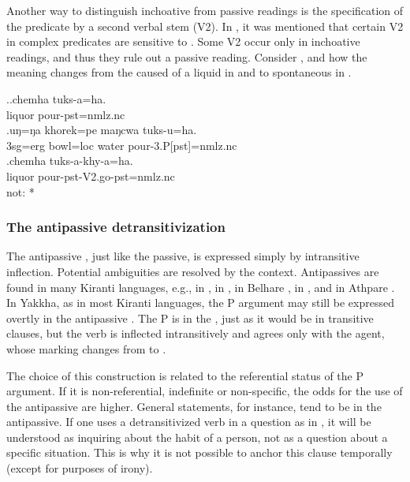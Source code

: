 Another way to distinguish inchoative from passive readings is the spe\-ci\-fi\-cation of the predicate by a second verbal stem (V2). In , it was mentioned that certain V2 in complex predicates are sensitive to . Some V2 occur only in inchoative readings, and thus they rule out a  passive reading. Consider \Next, and how the meaning changes from the caused  of a liquid in \Next[a] and \Next[b] to spontaneous  in \Next[c].

\ex.\ag.chemha tuks-a=ha.\\
liquor pour{\sc [3sg]-pst=nmlz.nc} \\
\bg.uŋ=ŋa khorek=pe maŋcwa tuks-u=ha.\\
{\sc 3sg=erg} bowl{\sc =loc} water pour{\sc -3.P[pst]=nmlz.nc}\\
\bg.chemha tuks-a-khy-a=ha.\\
liquor pour{\sc [3sg]-pst-V2.go-pst=nmlz.nc} \\
 not: *


\subsubsection{The antipassive detransitivization}\label{detr-antip}

The antipassive , just like the passive, is expressed simply by intransitive inflection. Potential ambiguities are  resolved by the context. Antipassives are  found in many Kiranti languages, e.g., in , in , in Belhare \citep{Bickel2011Detrans, Schikowski2013_Thesis}, in  \citep[221]{Doornenbal2009A-grammar}, and in Athpare \citep[122]{Ebert1997A-grammar}. In Yakkha, as in most Kiranti languages, the P argument may still be expressed overtly in the antipassive . The P is in the , just as it would be in transitive clauses, but the verb is inflected intransitively and agrees only with the agent, whose  marking changes from  to .

The choice of this construction is related to the referential status of the P argument. If it is non-referential, indefinite or non-specific, the odds for the use of the antipassive are higher. General statements, for instance,  tend to be in the antipassive. If one uses a detransitivized verb in a question as in \Next, it will be understood as inquiring about the habit of a person, not as a question about a specific situation. This is why it is not possible to anchor this clause temporally (except for purposes of irony). 


